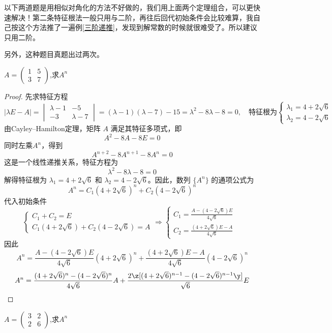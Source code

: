 \begin{remark}
以下两道题是用相似对角化的方法不好做的，我们用上面两个定理组合，可以更快速解决！第二条特征根法一般只用与二阶，再往后回代初始条件会比较难算，我自己按这个方法推了一遍例\ref{三阶递推}，发现到解常数的时候就很难受了。所以建议只用二阶。

另外，这种题目真题出过两次。
\end{remark}

\begin{example}[复旦2024]
$ A=
\begin{pmatrix}1&5\\
               3&7\end{pmatrix}
$,求$A^n $
\end{example}

\begin{proof}
先求特征方程
\[ 
|\lambda E - A| = \begin{vmatrix} \lambda - 1 & -5 \\ -3 & \lambda - 7 \end{vmatrix} = (\lambda - 1)(\lambda - 7) - 15 = \lambda^2 - 8\lambda - 8 = 0,\quad \text{特征根为} 
\begin{cases}
\lambda_1 = 4 + 2\sqrt{6} & \\
\lambda_2 = 4 - 2\sqrt{6}& 
\end{cases}
\]
由Cayley–Hamilton定理，矩阵 \(A\) 满足其特征多项式，即
\[ A^2 - 8A - 8E = 0 \]
同时左乘$A^n$，得到
\[ A^{n+2} - 8A^{n+1} - 8A^n = 0 \]
这是一个线性递推关系，特征方程为
\[ \lambda^2 - 8\lambda - 8 = 0 \]
解得特征根为 \(\lambda_1 = 4 + 2\sqrt{6}\) 和 \(\lambda_2 = 4 - 2\sqrt{6}\)。因此，数列 \(\{A^n\}\) 的通项公式为
\[ A^n = C_1 ( 4 + 2\sqrt{6})^n + C_2 (4 - 2\sqrt{6})^n \]
代入初始条件
\[
\begin{cases}
C_1 + C_2 = E \\
C_1 ( 4 + 2\sqrt{6}) + C_2 (4 - 2\sqrt{6}) = A
\end{cases}  \Rightarrow 
\begin{cases}
C_1 = \frac{A - (4 - 2\sqrt{6})E}{4\sqrt{6}} & \\
C_2 = \frac{(4 + 2\sqrt{6})E - A}{4\sqrt{6}} &
\end{cases} \]
因此
\[ A^n = \frac{A - (4 - 2\sqrt{6})E}{4\sqrt{6}} ( 4 + 2\sqrt{6})^n + \frac{(4 + 2\sqrt{6})E - A}{4\sqrt{6}} (4 - 2\sqrt{6})^n \]
\[ A^n =\frac{(4+2\sqrt{6})^n-(4-2\sqrt{6})^n}{4\sqrt{6}} A + \frac{2\z[(4+2\sqrt{6})^{n-1}-(4-2\sqrt{6})^{n-1} \y]}{\sqrt{6}}E \]
\end{proof}


\vspace{1mm}
\begin{example}[复旦2018]
$ A=
\begin{pmatrix}3&2\\
               2&6\end{pmatrix}
$,求$A^n $
\end{example}

